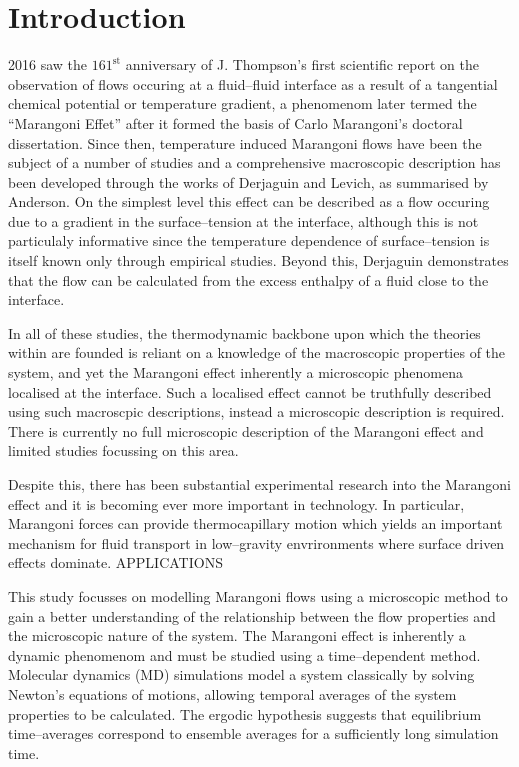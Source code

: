 \section{Introduction}
2016 saw the $161^{\mathrm{st}}$ anniversary of J. Thompson's first scientific report on the observation of flows occuring at a fluid--fluid interface as a result of a tangential chemical potential or temperature gradient, a phenomenom later termed the ``Marangoni Effet'' after it formed the basis of Carlo Marangoni's doctoral dissertation.
Since then, temperature induced Marangoni flows have been the subject of a number of studies and a comprehensive macroscopic description has been developed through the works of Derjaguin\cite{SurfaceForces} and Levich\cite{Levich}, as summarised by Anderson\cite{Anderson}.
On the simplest level this effect can be described as a flow occuring due to a gradient in the surface--tension at the interface, although this is not particulaly informative since the temperature dependence of surface--tension is itself known only through empirical studies.
Beyond this, Derjaguin demonstrates that the flow can be calculated from the excess enthalpy of a fluid close to the interface.

In all of these studies, the thermodynamic backbone upon which the theories within are founded is reliant on a knowledge of the macroscopic properties of the system, and yet the Marangoni effect inherently a microscopic phenomena localised at the interface.
Such a localised effect cannot be truthfully described using such macroscpic descriptions, instead a microscopic description is required. 
There is currently no full microscopic description of the Marangoni effect and limited studies focussing on this area.

Despite this, there has been substantial experimental research into the Marangoni effect and it is becoming ever more important in technology. 
In particular, Marangoni forces can provide thermocapillary motion which yields an important mechanism for fluid transport in low--gravity envrironments where surface driven effects dominate.
APPLICATIONS


This study focusses on modelling Marangoni flows using a microscopic method to gain a better understanding of the relationship between the flow properties and the microscopic nature of the system.
The Marangoni effect is inherently a dynamic phenomenom and must be studied using a time--dependent method.
Molecular dynamics (MD) simulations model a system classically by solving Newton's equations of motions, allowing temporal averages of the system properties to be calculated.\cite{Bopp2008}
The ergodic hypothesis suggests that equilibrium time--averages correspond to ensemble averages for a sufficiently long simulation time.

